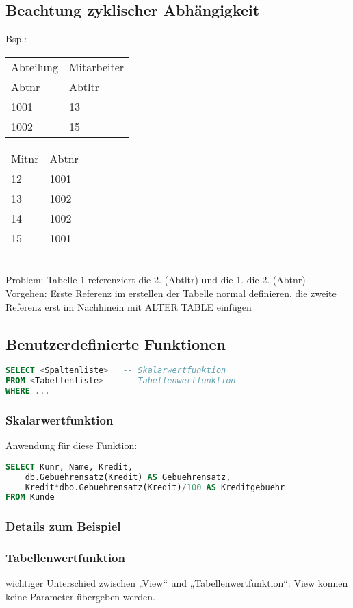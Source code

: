 \subsection{Beachtung zyklischer Abhängigkeit}
Bsp.:

\begin{tabular}{l l}
Abteilung &Mitarbeiter\\
Abtnr& Abtltr \\
\hline
1001 & 13\\
1002 & 15
\end{tabular}
\begin{tabular}{l l}
Mitnr & Abtnr\\
12 & 1001\\
13 & 1002\\
14 & 1002\\
15 & 1001\\
\end{tabular}\\
Problem: Tabelle 1 referenziert die 2. (Abtltr) und die 1. die 2. (Abtnr)\\
Vorgehen: Erste Referenz im erstellen der Tabelle normal definieren, die zweite Referenz erst im Nachhinein mit ALTER TABLE einfügen

\subsection{Benutzerdefinierte Funktionen}
\begin{lstlisting}[language=SQL]
SELECT <Spaltenliste>	-- Skalarwertfunktion
FROM <Tabellenliste>	-- Tabellenwertfunktion
WHERE ...
\end{lstlisting}
\subsubsection{Skalarwertfunktion}
Anwendung für diese Funktion:
\begin{lstlisting}[language=SQL]
SELECT Kunr, Name, Kredit,
	db.Gebuehrensatz(Kredit) AS Gebuehrensatz,
	Kredit*dbo.Gebuehrensatz(Kredit)/100 AS Kreditgebuehr
FROM Kunde
\end{lstlisting}
\subsubsection*{Details zum Beispiel}

\subsubsection{Tabellenwertfunktion}
wichtiger Unterschied zwischen „View“ und „Tabellenwertfunktion“: View können keine Parameter übergeben werden.
